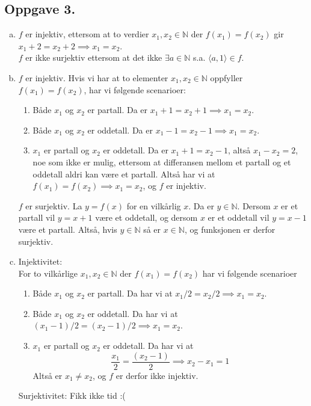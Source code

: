 \documentclass{article}
\begin{document}
\subsection*{Oppgave 3.}
\begin{enumerate}[(a)]
	\item {
		$f$ er injektiv, ettersom at to verdier $x_1, x_2 \in \mathbb{N}$ der $f(x_1) = f(x_2)$ gir 
		$x_1 + 2 = x_2 + 2 \implies x_1 = x_2$. \\
		$f$ er ikke surjektiv ettersom at det ikke $\exists a \in \mathbb{N}$ s.a. $\langle a, 1 \rangle \in f$.
	}
	\item {
		$f$ er injektiv. Hvis vi har at to elementer $x_1, x_2 \in \mathbb{N}$ oppfyller $f(x_1) = f(x_2)$, har vi følgende 
		scenarioer:
		\begin{enumerate}[1.]
			\item {
				Både $x_1$ og $x_2$ er partall. Da er $x_1 + 1 = x_2 + 1 \implies x_1 = x_2$.
			}
			\item {
				Både $x_1$ og $x_2$ er oddetall. Da er $x_1 - 1 = x_2 - 1 \implies x_1 = x_2$.
			}
			\item {
				$x_1$ er partall og $x_2$ er oddetall. Da er $x_1 + 1 = x_2 - 1$, altså 
				$x_1 - x_2 = 2$, noe som ikke er mulig, ettersom at differansen mellom et partall og et oddetall 
				aldri kan være et partall.
			}
		Altså har vi at $f(x_1) = f(x_2) \implies x_1 = x_2$, og $f$ er injektiv.
		\end{enumerate}
		$f$ er surjektiv. La $y = f(x)$ for en vilkårlig $x$. Da er $y \in \mathbb{N}$. Dersom $x$ er et partall 
		vil $y = x + 1$ være et oddetall, og dersom $x$ er et oddetall vil $y = x - 1$ være et partall. Altså, hvis 
		$y \in \mathbb{N}$ så er $x \in \mathbb{N}$, og funksjonen er derfor surjektiv.
	}
	\item {
		Injektivitet: \\
		For to vilkårlige $x_1, x_2 \in \mathbb{N}$ der $f(x_1) = f(x_2)$ har vi følgende scenarioer
		\begin{enumerate}[1.]
			\item {
				Både $x_1$ og $x_2$ er partall. Da har vi at $x_1/2 = x_2/2 \implies x_1 = x_2$.
			}
			\item {
				Både $x_1$ og $x_2$ er oddetall. Da har vi at $(x_1-1)/2 = (x_2-1)/2 \implies x_1 = x_2$.
			}
			\item {
				$x_1$ er partall og $x_2$ er oddetall. Da har vi at 
				$$\frac{x_1}{2} = \frac{(x_2-1)}{2} \implies x_2 - x_1 = 1$$
				Altså er $x_1 \neq x_2$, og $f$ er derfor ikke injektiv.
			}
		\end{enumerate}
		Surjektivitet: Fikk ikke tid :(
		
	}
\end{enumerate}
\end{document}
